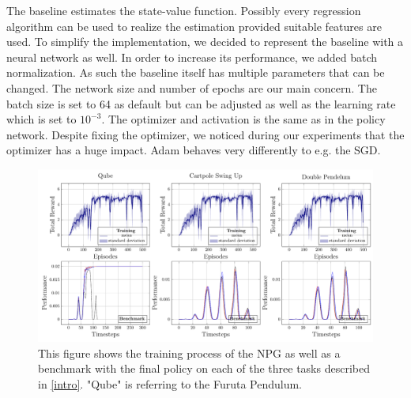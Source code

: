 \begin{itemize}
  The baseline estimates the state-value function. Possibly every regression algorithm can be used to realize the estimation provided suitable features are used. To simplify the implementation, we decided to represent the baseline with a neural network as well. In order to increase its performance, we added batch normalization. As such the baseline itself has multiple parameters that can be changed. The network size and number of epochs are our main concern. The batch size is set to 64 as default but can be adjusted as well as the learning rate which is set to $10^{-3}$. The optimizer and activation is the same as in the policy network. Despite fixing the optimizer, we noticed during our experiments that the optimizer has a huge impact. Adam behaves very differently to e.g. the SGD.
\end{itemize}
\begin{figure}
\centering
\includegraphics[width=\textwidth]{plots/learned_benchmarked_NPG.pdf}
\caption{This figure shows the training process of the NPG as well as a benchmark with the final policy on each of the three tasks described in \autoref{intro}. "Qube" is referring to the Furuta Pendulum.}
\label{fig:NPG_final}
\end{figure}

